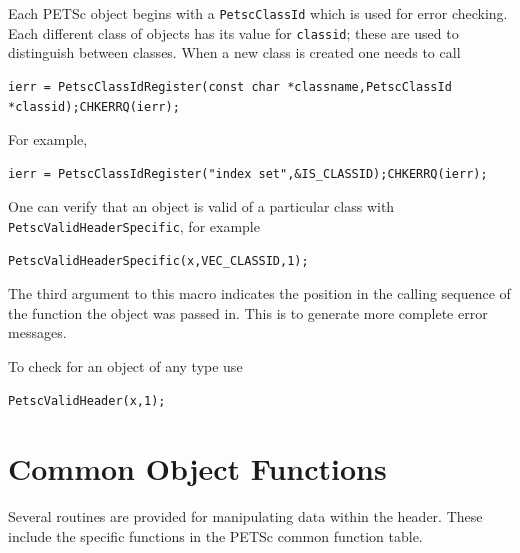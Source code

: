 Each PETSc object begins with a \lstinline{PetscClassId} which is used for error checking.
Each different class of objects has its value for \lstinline{classid}; these are used
to distinguish between classes. When a new class is created one needs to call
\begin{lstlisting}
ierr = PetscClassIdRegister(const char *classname,PetscClassId *classid);CHKERRQ(ierr);
\end{lstlisting}
For example,
\begin{lstlisting}
ierr = PetscClassIdRegister("index set",&IS_CLASSID);CHKERRQ(ierr);
\end{lstlisting}
One can verify that an object is valid of a particular class with \lstinline{PetscValidHeaderSpecific}, for example
\begin{lstlisting}
PetscValidHeaderSpecific(x,VEC_CLASSID,1);
\end{lstlisting}
The third argument to this macro indicates the position in the calling sequence of the
function the object was passed in. This is to generate more complete error messages.

To check for an object of any type use
\begin{lstlisting}
PetscValidHeader(x,1);
\end{lstlisting}

\section{Common Object Functions}

Several routines are provided for manipulating data within the header.
These include the specific functions in the PETSc common function table.

